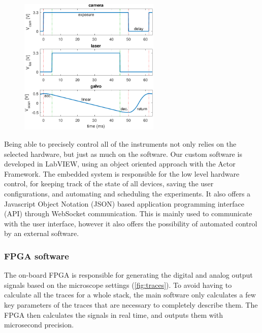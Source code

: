     \begin{figure}
      \centering
      \includegraphics[width = 0.6\textwidth]{fpgaTraces}
      \label{fig:traces}
    \end{figure}

    Being able to precisely control all of the instruments not only relies on the selected hardware, but just as much on the software. Our custom software is developed in LabVIEW, using an object oriented approach with the Actor Framework. The embedded system is responsible for the low level hardware control, for keeping track of the state of all devices, saving the user configurations, and automating and scheduling the experiments. It also offers a Javascript Object Notation (JSON) based application programming interface (API) through WebSocket communication. This is mainly used to communicate with the user interface, however it also offers the possibility of automated control by an external software.

    \subsubsection{FPGA software}
      The on-board FPGA is responsible for generating the digital and analog output signals based on the microscope settings (\autoref{fig:traces}). To avoid having to calculate all the traces for a whole stack, the main software only calculates a few key parameters of the traces that are necessary to completely describe them. The FPGA then calculates the signals in real time, and outputs them with microsecond precision.

